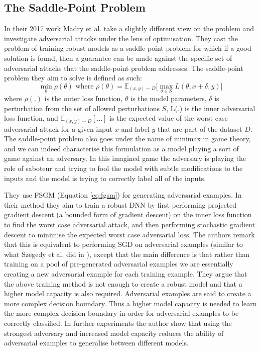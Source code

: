 \documentclass{article}
\begin{document}
\subsection{The Saddle-Point Problem}
In their 2017 work \cite{madry2017towards} Madry et al. take a slightly different view on the problem and investigate adversarial attacks under the lens of optimisation. They cast the problem of training robust models as a saddle-point problem for which if a good solution is found, then a guarantee can be made against the specific set of adversarial attacks that the saddle-point problem addresses.
The saddle-point problem they aim to solve is defined as such:
\begin{equation*}
    \displaystyle \min_{\theta} \rho(\theta) \text{ where } \rho(\theta) = \mathbb{E}_{(x, y) \sim D} \Big[\displaystyle \max_{\delta \in S} L(\theta, x + \delta, y)\Big]
\end{equation*}
where $\rho(.)$ is the outer loss function, $\theta$ is the model parameters, $\delta$ is perturbation from the set of allowed perturbations $S$, L(.) is the inner adversarial loss function, and $\mathbb{E}_{(x, y) \sim D} [\dots]$ is the expected value of the worst case adversarial attack for a given input $x$ and label $y$ that are part of the dataset $D$. The saddle-point problem also goes under the name of minimax in game theory, and we can indeed characterise this formulation as a model playing a sort of game against an adversary. In this imagined game the adversary is playing the role of saboteur and trying to fool the model with subtle modifications to the inputs and the model is trying to correctly label all of the inputs. 

They use FSGM (Equation \ref{eq:fgsm}) for generating adversarial examples. 
In their method they aim to train a robust DNN by first performing projected gradient descent (a bounded form of gradient descent) on the inner loss function to find the worst case adversarial attack, and then performing stochastic gradient descent to minimise the expected worst case adversarial loss. The authors remark that this is equivalent to performing SGD on adversarial examples (similar to what Szegedy et al. did in \cite{szegedy2013intriguing}), except that the main difference is that rather than training on a pool of pre-generated adversarial examples we are essentially creating a new adversarial example for each training example.
They argue that the above training method is not enough to create a robust model and that a higher model capacity is also required. Adversarial examples are said to create a more complex decision boundary. Thus a higher model capacity is needed to learn the more complex decision boundary in order for adversarial examples to be correctly classified. 
In further experiments the author show that using the strongest adversary and increased model capacity reduces the ability of adversarial examples to generalise between different models.
\end{document}
